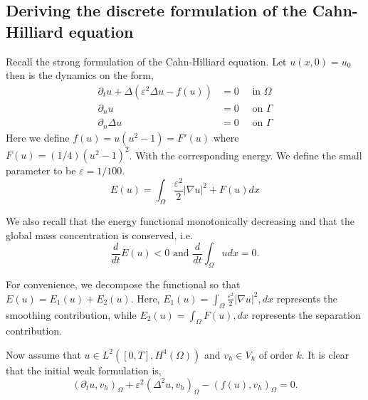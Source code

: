 \documentclass[11pt]{article}
\theoremstyle{remark}
\newcommand{\abs}[1]{\left\lvert #1 \right\rvert}
\numberwithin{equation}{section}
\begin{document}
\subsection{Deriving the discrete formulation of the Cahn-Hilliard equation}%
\label{sub:revisiting_the_strong_formulation}

 Recall the strong formulation of the Cahn-Hilliard equation.
Let $ u( x,0) =  u_{0}$ then is the dynamics on the form,
\begin{subequations}
\label{eq:strong_ch}
    \begin{align}
\partial _{t} u + \Delta  \left(  \varepsilon^2  \Delta u - f( u) \right)   &=0  \quad \text{ in } \Omega  \\
\partial _{n} u &= 0 \quad \text{ on } \Gamma  \\
\partial _{n}    \Delta u       &= 0 \quad \text{ on } \Gamma
    \end{align}
\end{subequations}
Here we define $f( u) = u( u^{2} -1)  = F' ( u)  $ where $F( u) = ( 1 / 4 ) ( u^2 -1 ) ^{2} $. With the corresponding energy. We define the small parameter to be $\varepsilon  = 1 / 100$.
\begin{equation}
    \label{eq:physical_prop}
E( u)  = \int_{\Omega }^{} \frac{\varepsilon^{2} }{2} \abs{ \nabla u } ^2 +  F( u) dx
\end{equation}

We also recall that the energy functional monotonically decreasing and that the global mass concentration is conserved, i.e.
\begin{equation}
\label{eq:mass_cons_energy_decrease2}
\frac{d}{dt} E( u)  <  0 \text{ and }\frac{d}{dt} \int_{\Omega }^{}  u dx = 0.
\end{equation}

For convenience, we decompose the functional so that $E(u) = E_{1}(u) + E_{2}(u)$. Here, $E_{1}(u) = \int_{\Omega } \frac{\varepsilon^{2}}{2} |\nabla u|^2 , dx$ represents the smoothing contribution, while $E_{2}(u) = \int_{\Omega } F(u) , dx$ represents the separation contribution.

Now assume that $u \in L^2( [0,T], H^{4}( \Omega ) ) $ and $v_{h} \in  V_{h}$ of order $k$. It is clear that the initial weak formulation is,
\begin{equation}
    ( \partial_{t} u,v_{h} )_{\Omega }  + \varepsilon^{2} ( \Delta ^2u, v_{h})_{\Omega } -  ( f( u), v_{h} )_{\Omega } = 0.
\end{equation}
\end{document}

